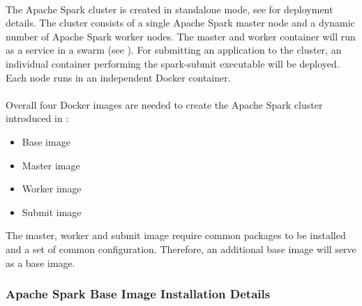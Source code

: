 \paragraph{}The Apache Spark cluster is created in standalone mode, see  for deployment details.
The cluster consists of a single Apache Spark master node and a dynamic number of Apache Spark worker nodes. The master and worker container will run as a service in a swarm (see ).
For submitting an application to the cluster, an individual container performing the spark-submit executable will be deployed.
Each node runs in an independent Docker container.


\paragraph{}Overall four Docker images are needed to create the Apache Spark cluster introduced in :
\begin{itemize}
\item Base image
\item Master image
\item Worker image
\item Submit image
\end{itemize}
The master, worker and submit image require common packages to be installed and a set of common configuration. Therefore, an additional base image will serve as a base image.

\subsubsection{Apache Spark Base Image Installation Details}
